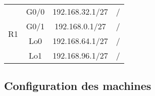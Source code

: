 \documentclass[a4paper]{article}
\begin{document}
\begin{itemize}
\begin{center}
\begin{tabular}{|c|c|c|c|}
        \multirow{4}{*}{R1}
        & G0/0 & 192.168.32.1/27 & / \\
        & G0/1 & 192.168.0.1/27 & / \\

        & Lo0 & 192.168.64.1/27 & / \\
        & Lo1 & 192.168.96.1/27 & / \\ \hline
    \end{tabular}
\end{center}





\end{itemize}










\subsection{Configuration des machines}
\end{document}
